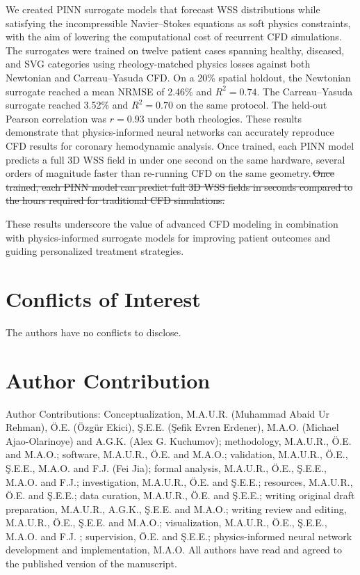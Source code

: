 ﻿\documentclass[12pt,a4paper]{article}
\newcommand{\added}[2][]{\begingroup\color{red}#2\endgroup}
\newcommand{\deleted}[2][]{\begingroup\color{red}\sout{#2}\endgroup}
\newcommand{\replaced}[3][]{\added{#2}\,\deleted{#3}}
\newcommand{\addp}[1]{\added{#1}}
\theoremstyle{definition}
\numberwithin{equation}{section}
\begin{document}
{We created PINN surrogate models that forecast WSS distributions while satisfying the incompressible Navier--Stokes equations as soft physics constraints, with the aim of lowering the computational cost of recurrent CFD simulations. \addp{The surrogates were trained on twelve patient cases spanning healthy, diseased, and SVG categories using rheology-matched physics losses against both Newtonian and Carreau--Yasuda CFD. On a 20\% spatial holdout, the Newtonian surrogate reached a mean NRMSE of 2.46\% and $R^2 = 0.74$. The Carreau--Yasuda surrogate reached 3.52\% and $R^2 = 0.70$ on the same protocol. The held-out Pearson correlation was $r = 0.93$ under both rheologies. These results demonstrate that physics-informed neural networks can accurately reproduce CFD results for coronary hemodynamic analysis.} \replaced[id=pinn]{Once trained, each PINN model predicts a full 3D WSS field in under one second on the same hardware, several orders of magnitude faster than re-running CFD on the same geometry.}{Once trained, each PINN model can predict full 3D WSS fields in seconds compared to the hours required for traditional CFD simulations.}}

These results underscore the value of advanced CFD modeling {in combination with physics-informed surrogate models} for improving patient outcomes and guiding personalized treatment strategies.

\section*{Conflicts of Interest}
The authors have no conflicts to disclose.

\section*{Author Contribution}{Author Contributions: Conceptualization, M.A.U.R. (Muhammad Abaid Ur Rehman), Ö.E. (Özgür Ekici), Ş.E.E. (Şefik Evren Erdener), M.A.O. (Michael Ajao-Olarinoye) and {A.G.K. (Alex G. Kuchumov)}; methodology, M.A.U.R., Ö.E. {and M.A.O.}; software, M.A.U.R., Ö.E. {and M.A.O.}; validation, M.A.U.R., Ö.E., Ş.E.E., {M.A.O.} and  F.J. (Fei Jia); formal analysis, M.A.U.R., Ö.E., Ş.E.E., { M.A.O.} and F.J.; investigation, M.A.U.R., Ö.E. and Ş.E.E.; resources, M.A.U.R., Ö.E. and Ş.E.E.; data curation, M.A.U.R., Ö.E. and Ş.E.E.; writing original draft preparation, M.A.U.R., A.G.K., Ş.E.E. {and M.A.O.}; writing review and editing, M.A.U.R., Ö.E., Ş.E.E. {and M.A.O.}; visualization, M.A.U.R., Ö.E., Ş.E.E., {M.A.O.} and  F.J. ; supervision, Ö.E. and Ş.E.E.; {physics-informed neural network development and implementation, M.A.O.} All authors have read and agreed to the published version of the manuscript.}
\end{document}
